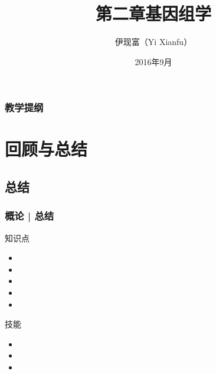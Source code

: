 



\title[基因组学]{第二章\quad 基因组学}
\author[Yixf]{伊现富（Yi Xianfu）}
\date{2016年9月}


\begin{frame}[label=current]
  \titlepage
\end{frame}

\begin{frame}[plain,label=current]
  \frametitle{教学提纲}
  \setcounter{tocdepth}{3}
  \begin{multicols}{2}
    \tableofcontents
  \end{multicols}
\end{frame}









\section{回顾与总结}
\subsection{总结}
\begin{frame}[label=current]
  \frametitle{概论 | 总结}
  \begin{block}{知识点}
    \begin{itemize}
      \item 
      \item 
      \item 
      \item 
      \item 
    \end{itemize}
  \end{block}
  \begin{block}{技能}
    \begin{itemize}
      \item 
      \item 
      \item 
    \end{itemize}
  \end{block}
\end{frame}

